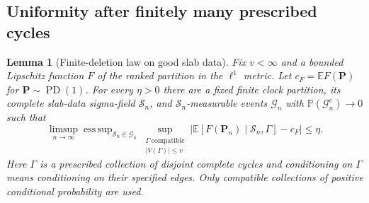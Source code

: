 \documentclass[11pt]{article}
\numberwithin{equation}{section}
\newcommand{\E}{\mathbb E}
\newcommand{\Pp}{\mathbb P}
\newcommand{\PD}{\operatorname{PD}}
\newtheorem{lemma}[theorem]{Lemma}
\theoremstyle{definition}
\theoremstyle{remark}
\begin{document}
\subsection{Uniformity after finitely many prescribed cycles}

\begin{lemma}[Finite-deletion law on good slab data]
\label{lem:finite-deletion}
Fix $v<\infty$ and a bounded Lipschitz function $F$ of the ranked partition
in the $\ell^1$ metric.  Let $c_F=\E F(\mathbf P)$ for
$\mathbf P\sim\PD(1)$.  For every $\eta>0$ there are a fixed finite clock
partition, its complete slab-data sigma-field $\mathscr S_n$, and
$\mathscr S_n$-measurable events $\mathcal G_n$ with
$\Pp(\mathcal G_n^c)\to0$ such that
\begin{equation}\label{eq:slab-uniform}
 \limsup_{n\to\infty}
 \mathop{\operatorname{ess\,sup}}_{\mathscr S_n\in\mathcal G_n}
 \sup_{\substack{\Gamma\ \mathrm{compatible}\\|V(\Gamma)|\le v}}
 \left|\E[F(\mathbf P_n)\mid\mathscr S_n,\Gamma]-c_F\right|
 \le\eta.
\end{equation}
Here $\Gamma$ is a prescribed collection of disjoint complete cycles and
conditioning on $\Gamma$ means conditioning on their specified edges.
Only compatible collections of positive conditional probability are used.
\end{lemma}
\end{document}

